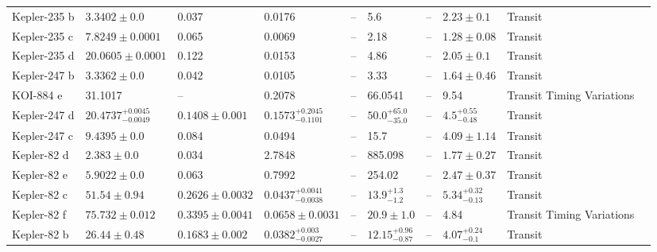 \begin{tabular}{llllllllll}
Kepler-235 b & $3.3402 \pm 0.0$ & 0.037 & 0.0176 & -- & 5.6 & -- & $2.23 \pm 0.1$ & Transit & \cite{ROWE_ET_AL__2014} \\
Kepler-235 c & $7.8249 \pm 0.0001$ & 0.065 & 0.0069 & -- & 2.18 & -- & $1.28 \pm 0.08$ & Transit & \cite{ROWE_ET_AL__2014} \\
Kepler-235 d & $20.0605 \pm 0.0001$ & 0.122 & 0.0153 & -- & 4.86 & -- & $2.05 \pm 0.1$ & Transit & \cite{ROWE_ET_AL__2014} \\
Kepler-247 b & $3.3362 \pm 0.0$ & 0.042 & 0.0105 & -- & 3.33 & -- & $1.64 \pm 0.46$ & Transit & \cite{ROWE_ET_AL__2014} \\
KOI-884 e & 31.1017 & -- & 0.2078 & -- & 66.0541 & -- & 9.54 & Transit Timing Variations & \cite{LAMMERS__WINN_2026} \\
Kepler-247 d & $20.4737^{+0.0045}_{-0.0049}$ & $0.1408 \pm 0.001$ & $0.1573^{+0.2045}_{-0.1101}$ & -- & $50.0^{+65.0}_{-35.0}$ & -- & $4.5^{+0.55}_{-0.48}$ & Transit & \cite{NESVORNY_ET_AL_2014} \\
Kepler-247 c & $9.4395 \pm 0.0$ & 0.084 & 0.0494 & -- & 15.7 & -- & $4.09 \pm 1.14$ & Transit & \cite{ROWE_ET_AL__2014} \\
Kepler-82 d & $2.383 \pm 0.0$ & 0.034 & 2.7848 & -- & 885.098 & -- & $1.77 \pm 0.27$ & Transit & \cite{ROWE_ET_AL__2014} \\
Kepler-82 e & $5.9022 \pm 0.0$ & 0.063 & 0.7992 & -- & 254.02 & -- & $2.47 \pm 0.37$ & Transit & \cite{ROWE_ET_AL__2014} \\
Kepler-82 c & $51.54 \pm 0.94$ & $0.2626 \pm 0.0032$ & $0.0437^{+0.0041}_{-0.0038}$ & -- & $13.9^{+1.3}_{-1.2}$ & -- & $5.34^{+0.32}_{-0.13}$ & Transit & \cite{FREUDENTHAL_ET_AL__2019} \\
Kepler-82 f & $75.732 \pm 0.012$ & $0.3395 \pm 0.0041$ & $0.0658 \pm 0.0031$ & -- & $20.9 \pm 1.0$ & -- & 4.84 & Transit Timing Variations & \cite{FREUDENTHAL_ET_AL__2019} \\
Kepler-82 b & $26.44 \pm 0.48$ & $0.1683 \pm 0.002$ & $0.0382^{+0.003}_{-0.0027}$ & -- & $12.15^{+0.96}_{-0.87}$ & -- & $4.07^{+0.24}_{-0.1}$ & Transit & \cite{FREUDENTHAL_ET_AL__2019} \\
\bottomrule
\end{tabular}

